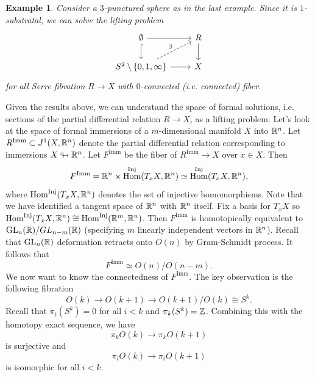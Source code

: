 \documentclass{article}
\newtheorem{example}[theorem]{Example}
\newtheorem{proposed work}[theorem]{Proposed Work}
\DeclareMathOperator{\Hom}{Hom}
\DeclareMathOperator{\Imm}{Imm}
\DeclareMathOperator{\GL}{GL}
\begin{document}
\begin{example}
Consider a $3$-punctured sphere as in the last example. Since it is $1$-substratal, we can solve the lifting problem
\begin{equation*}
\begin{tikzcd}
\emptyset \arrow[r] \arrow[hookrightarrow]{d}
& R \arrow[d]
\\
S^2\setminus\{0,1,\infty\} \arrow[r] \arrow[dashed,ur,"\exists"]
& X
\end{tikzcd}
\end{equation*}
for all Serre fibration $R\to X$ with $0$-connected (i.e. connected) fiber.
\end{example}

Given the results above, we can understand the space of formal solutions, i.e. sections of the partial differential relation $R\to X$, as a lifting problem. Let's look at the space of formal immersions of a $m$-dimensional manifold $X$ into $\mathbb R^n$. Let $R^{\Imm} \subset J^1(X,\R^n)$ denote the partial differential relation corresponding to immersions $X\looparrowright \mathbb R^n$. Let $F^{\Imm}$ be the fiber of $R^{\Imm}\to X$ over $x \in X$. Then
\begin{equation*}
F^{\Imm} = \R^n \times \Hom^{\mathrm{Inj}}(T_xX,\R^n) \simeq \Hom^{\mathrm{Inj}}(T_xX,\R^n),
\end{equation*}
where $\Hom^{\mathrm{Inj}}(T_xX,\R^n)$ denotes the set of injective homomorphisms. Note that we have identified a tangent space of $\mathbb R^n$ with $\mathbb R^n$ itself. Fix a basis for $T_xX$ so $\Hom^{\mathrm{Inj}}(T_xX,\R^n) \cong \Hom^{\mathrm{Inj}}(\R^m,\R^n)$. Then $F^{\Imm}$ is homotopically equivalent to $\GL_n(\R)/GL_{n-m}(\R)$ (specifying $m$ linearly independent vectors in $\mathbb R^n$). Recall that $\GL_n(\R)$ deformation retracts onto $O(n)$ by Gram-Schmidt process. It follows that
\begin{equation*}
F^{\Imm} \simeq O(n)/O(n-m).
\end{equation*}
We now want to know the connectedness of $F^{\Imm}$. The key observation is the following fibration
\begin{equation*}
O(k)\to O(k+1) \to O(k+1)/O(k) \cong S^k.
\end{equation*}
Recall that $\pi_i(S^k) = 0$ for all $i <k$ and $\pi_k(S^k) = \mathbb Z$. Combining this with the homotopy exact sequence, we have
\begin{equation*}
\pi_k O(k) \to \pi_k O(k+1)
\end{equation*}
is surjective and
\begin{equation*}
\pi_i O(k) \to \pi_i O(k+1)
\end{equation*}
is isomorphic for all $i < k$.
\end{document}
